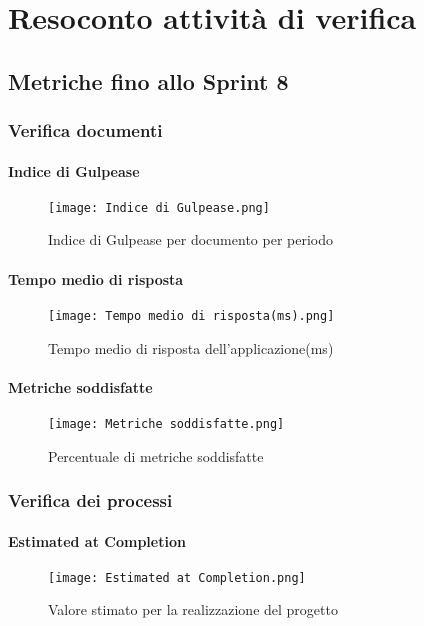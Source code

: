 \chapter{Resoconto attività di verifica}

\section{Metriche fino allo Sprint 8}

  \subsection{Verifica documenti}
    \subsubsection{Indice di Gulpease}
    \begin{figure}[H]
      \centering
      \texttt{[image: Indice di Gulpease.png]}
      \caption{Indice di Gulpease per documento per periodo}
    \end{figure}

    \subsubsection{Tempo medio di risposta}
    \begin{figure}[H]
      \centering
      \texttt{[image: Tempo medio di risposta(ms).png]}
      \caption{Tempo medio di risposta dell'applicazione(ms)}
    \end{figure}

    \subsubsection{Metriche soddisfatte}
    \begin{figure}[H]
      \centering
      \texttt{[image: Metriche soddisfatte.png]}
      \caption{Percentuale di metriche soddisfatte}
    \end{figure}


  \subsection{Verifica dei processi}

    \subsubsection{Estimated at Completion}
    \begin{figure}[H]
      \centering
      \texttt{[image: Estimated at Completion.png]}
      \caption{Valore stimato per la realizzazione del progetto}
    \end{figure}

